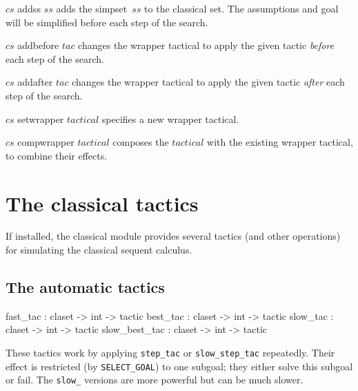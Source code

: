 \begin{ttdescription}
\item[$cs$ addss $ss$] 
adds the simpset~$ss$ to the classical set.  The assumptions and goal will be
simplified before each step of the search.

\item[$cs$ addbefore $tac$] 
changes the wrapper tactical to apply the given tactic {\em before}
each step of the search.

\item[$cs$ addafter $tac$] 
changes the wrapper tactical to apply the given tactic {\em after}
each step of the search.

\item[$cs$ setwrapper $tactical$] 
specifies a new wrapper tactical.  

\item[$cs$ compwrapper $tactical$] 
composes the $tactical$ with the existing wrapper tactical, to combine their
effects. 
\end{ttdescription}


\section{The classical tactics}
If installed, the classical module provides several tactics (and other
operations) for simulating the classical sequent calculus.

\subsection{The automatic tactics}
\begin{ttbox} 
fast_tac      : claset -> int -> tactic
best_tac      : claset -> int -> tactic
slow_tac      : claset -> int -> tactic
slow_best_tac : claset -> int -> tactic
\end{ttbox}
These tactics work by applying {\tt step_tac} or {\tt slow_step_tac}
repeatedly.  Their effect is restricted (by {\tt SELECT_GOAL}) to one subgoal;
they either solve this subgoal or fail.  The {\tt slow_} versions are more
powerful but can be much slower.  

